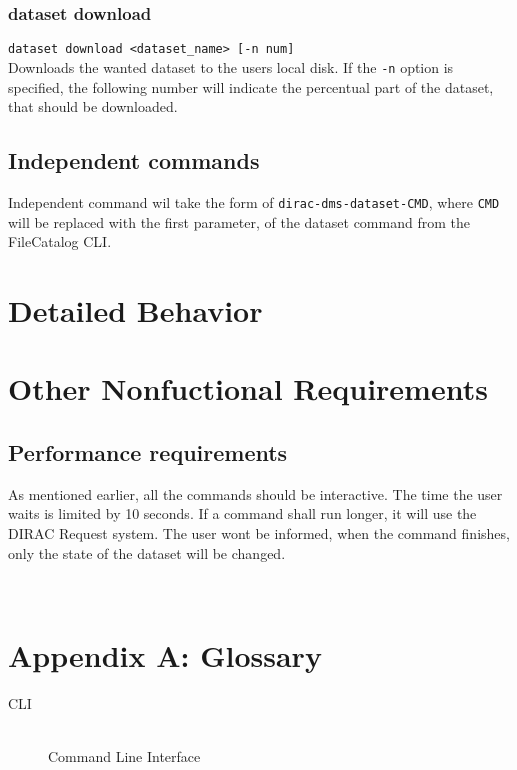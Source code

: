 \documentclass{scrreprt}
\begin{document}
\subsection{dataset download}
\texttt{dataset download <dataset_name> [-n num]} \\
Downloads the wanted dataset to the users local disk. If the \texttt{-n} option is specified, the following number will indicate the percentual part of the dataset, that should be downloaded.


\section{Independent commands}
Independent command wil take the form of \texttt{dirac-dms-dataset-CMD}, where \texttt{CMD} will be replaced with the first parameter, of the dataset command from the FileCatalog CLI. 



\chapter{Detailed Behavior} \label{chap:Details}



\chapter{Other Nonfuctional Requirements}

\section{Performance requirements} \label{sec:Performance}
As mentioned earlier, all the commands should be interactive. The time the user waits is limited by 10 seconds. If a command shall run longer, it will use the DIRAC Request system. The user wont be informed, when the command finishes, only the state of the dataset will be changed.

\

\newpage
\appendix
\chapter*{Appendix A: Glossary} \label{app:AppendixA}
\begin{description}
\item[CLI] \hfill \\
Command Line Interface
\end{description}
\end{document}
